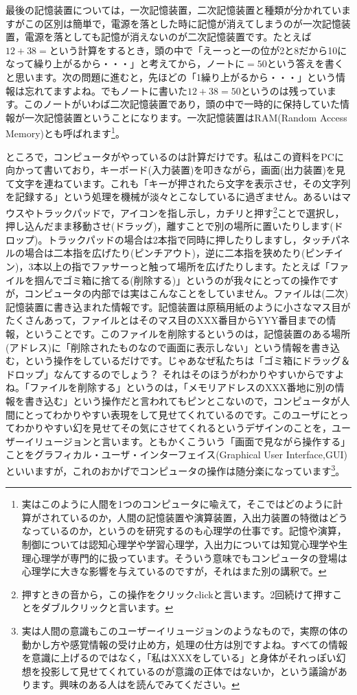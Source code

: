 \documentclass{ltjsbook}
\begin{document}
最後の記憶装置については，一次記憶装置，二次記憶装置と種類が分かれていますがこの区別は簡単で，電源を落とした時に記憶が消えてしまうのが一次記憶装置，電源を落としても記憶が消えないのが二次記憶装置です。たとえば$12+38=$という計算をするとき，頭の中で「えーっと一の位が2と8だから10になって繰り上がるから・・・」と考えてから，ノートに$=50$という答えを書くと思います。次の問題に進むと，先ほどの「1繰り上がるから・・・」という情報は忘れてますよね。でもノートに書いた$12+38=50$というのは残っています。このノートがいわば二次記憶装置であり，頭の中で一時的に保持していた情報が一次記憶装置ということになります。一次記憶装置はRAM(Random Access Memory)とも呼ばれます\footnote{実はこのように人間を1つのコンピュータに喩えて，そこではどのように計算がされているのか，人間の記憶装置や演算装置，入出力装置の特徴はどうなっているのか，というのを研究するのも心理学の仕事です。記憶や演算，制御については認知心理学や学習心理学，入出力については知覚心理学や生理心理学が専門的に扱っています。そういう意味でもコンピュータの登場は心理学に大きな影響を与えているのですが，それはまた別の講釈で。}。

ところで，コンピュータがやっているのは計算だけです。私はこの資料をPCに向かって書いており，キーボード(入力装置)を叩きながら，画面(出力装置)を見て文字を連ねています。これも「キーが押されたら文字を表示させ，その文字列を記録する」という処理を機械が淡々とこなしているに過ぎません。あるいはマウスやトラックパッドで，アイコンを指し示し，カチリと押す\footnote{押すときの音から，この操作をクリックclickと言います。2回続けて押すことをダブルクリックと言います。}ことで選択し，押し込んだまま移動させ(ドラッグ)，離すことで別の場所に置いたりします(ドロップ)。トラックパッドの場合は2本指で同時に押したりしますし，タッチパネルの場合は二本指を広げたり(ピンチアウト)，逆に二本指を狭めたり(ピンチイン)，3本以上の指でファサーっと触って場所を広げたりします。たとえば「ファイルを掴んでゴミ箱に捨てる(削除する)」というのが我々にとっての操作ですが，コンピュータの内部では実はこんなことをしていません。ファイルは(二次)記憶装置に書き込まれた情報です。記憶装置は原稿用紙のように小さなマス目がたくさんあって，ファイルとはそのマス目のXXX番目からYYY番目までの情報，ということです。このファイルを削除するというのは，記憶装置のある場所(アドレス)に「削除されたものなので画面に表示しない」という情報を書き込む，という操作をしているだけです。じゃあなぜ私たちは「ゴミ箱にドラッグ＆ドロップ」なんてするのでしょう？ それはそのほうがわかりやすいからですよね。「ファイルを削除する」というのは，「メモリアドレスのXXX番地に別の情報を書き込む」という操作だと言われてもピンとこないので，コンピュータが人間にとってわかりやすい表現をして見せてくれているのです。このユーザにとってわかりやすい幻を見せてその気にさせてくれるというデザインのことを，ユーザーイリュージョンと言います。ともかくこういう「画面で見ながら操作する」ことをグラフィカル・ユーザ・インターフェイス(Graphical User Interface,GUI)といいますが，これのおかげでコンピュータの操作は随分楽になっています\footnote{実は人間の意識もこのユーザーイリュージョンのようなもので，実際の体の動かし方や感覚情報の受け止め方，処理の仕方は別ですよね。すべての情報を意識に上げるのではなく，「私はXXXをしている」と身体がそれっぽい幻想を投影して見せてくれているのが意識の正体ではないか，という議論があります。興味のある人は\textcite{UserIlluision2002}を読んでみてください。}。
\end{document}
